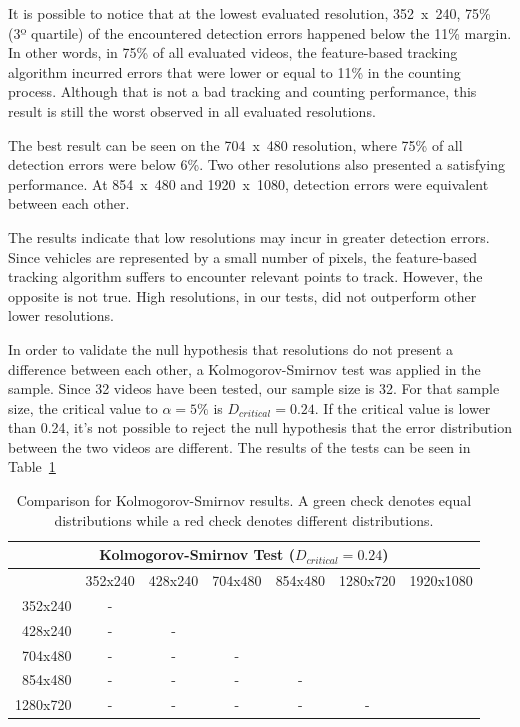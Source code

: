 \documentclass[article,12pt,a4paper,oneside,hidelinks]{memoir}
\newcommand{\cmark}{\ding{51}}%
\newcommand{\xmark}{\ding{55}}%
\begin{document}
It is possible to notice that at the lowest evaluated resolution, 352~x~240, 75\% (3º quartile) of the encountered detection errors happened below the 11\% margin. In other words, in 75\% of all evaluated videos, the feature-based tracking algorithm incurred errors that were lower or equal to 11\% in the counting process. Although that is not a bad tracking and counting performance, this result is still the worst observed in all evaluated resolutions.

The best result can be seen on the 704~x~480 resolution, where 75\% of all detection errors were below 6\%. Two other resolutions also presented a satisfying performance. At 854~x~480 and 1920~x~1080, detection errors were equivalent between each other.

The results indicate that low resolutions may incur in greater detection errors. Since vehicles are represented by a small number of pixels, the feature-based tracking algorithm suffers to encounter relevant points to track. However, the opposite is not true. High resolutions, in our tests, did not outperform other lower resolutions. 

In order to validate the null hypothesis that resolutions do not present a difference between each other, a Kolmogorov-Smirnov test was applied in the sample. Since 32 videos have been tested, our sample size is 32. For that sample size, the critical value to $\alpha = 5\%$ is $D_{critical} = 0.24$. If the critical value is lower than 0.24, it's not possible to reject the null hypothesis that the error distribution between the two videos are different. The results of the tests can be seen in Table~\ref{tab:tab3}  

\begin{table}[h]
	\centering
	\caption{Comparison for Kolmogorov-Smirnov results. A green check denotes equal distributions while a red check denotes different distributions.}
	\begin{tabular}{rcccccc} 
		\hline
		\multicolumn{7}{c}{\textbf{Kolmogorov-Smirnov Test ($D_{critical}=0.24$)}} \\ 
		\hline
		         &352x240 &428x240    			  &704x480 					&854x480   				  &1280x720 				& 1920x1080   			  \\
		352x240  &-		  &\textcolor{ao}{\cmark} &\textcolor{bred}{\xmark} &\textcolor{bred}{\xmark} &\textcolor{bred}{\xmark} &\textcolor{bred}{\xmark} \\
		428x240  &-       &-  		  			  &\textcolor{bred}{\xmark} &\textcolor{bred}{\xmark} &\textcolor{bred}{\xmark} &\textcolor{bred}{\xmark} \\
		704x480  &-		  &-          			  &-  		 			    &\textcolor{ao}{\cmark}   &\textcolor{ao}{\cmark}   &\textcolor{ao}{\cmark}   \\
		854x480  &-		  &-         			  &- 		 				&-  		 			  &\textcolor{ao}{\cmark}   &\textcolor{ao}{\cmark}   \\
		1280x720 &-	      &-         			  &- 		 				&-  		 			  &- 		 			    &\textcolor{ao}{\cmark}   \\
		\hline
	\end{tabular}
	\label{tab:tab3}
\end{table}
\end{document}
